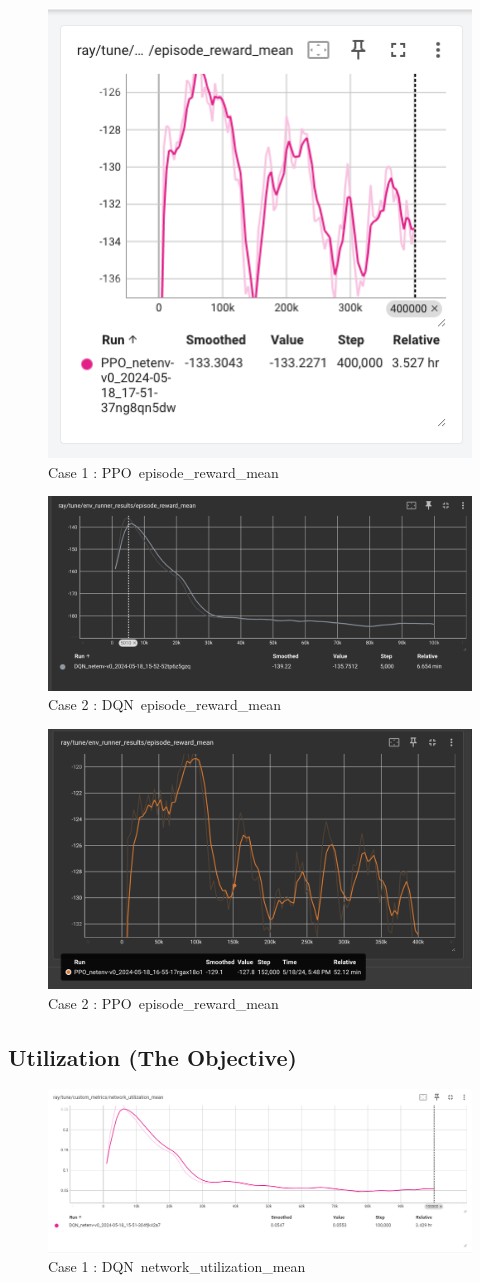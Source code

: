 \documentclass[conference]{IEEEtran}
\begin{document}
\begin{figure}[H]
    \centering
    \includegraphics[width=0.5\linewidth]{ppo_fixed_reward.png}
    \caption{Case 1 : PPO\ episode\_reward\_mean}
    \label{fig:enter-label}
\end{figure}

\begin{figure}[H]
    \centering
    \includegraphics[width=0.5\linewidth]{dqn_random_reward.png}
    \caption{Case 2 : DQN\ episode\_reward\_mean}
    \label{fig:enter-label}
\end{figure}

\begin{figure}[H]
    \centering
    \includegraphics[width=0.5\linewidth]{ppo_random_reward.png}
    \caption{Case 2 : PPO\ episode\_reward\_mean}
    \label{fig:enter-label}
\end{figure}





\subsection{\textbf{Utilization (The Objective)}}
\begin{figure}[H]
    \centering
    \includegraphics[width=0.5\linewidth]{dqn_fixed_ut.png}
    \caption{Case 1 : DQN\ network\_utilization\_mean}
    \label{fig:enter-label}
\end{figure}
\end{document}
